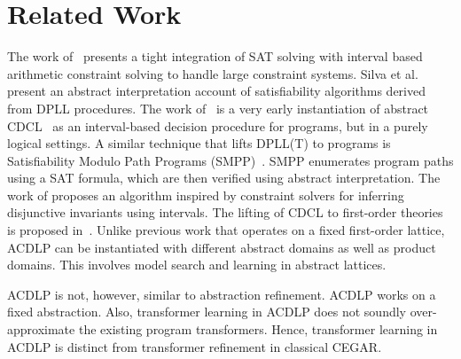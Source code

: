 \section{Related Work}
%
The work of~\cite{franzle} presents a tight integration of SAT solving
with interval based arithmetic constraint solving to handle large constraint
systems. 
%
Silva et al.~\cite{sas12} present an abstract interpretation account of 
satisfiability algorithms derived from DPLL procedures.  
%
The work of~\cite{tacas12} is a very early instantiation of abstract 
CDCL~\cite{sas12} as an interval-based decision procedure for programs, 
but in a purely logical settings.  
%
A similar technique that lifts DPLL(T) to programs is Satisfiability Modulo 
Path Programs (SMPP)~\cite{SMPP}. SMPP enumerates program paths using a SAT 
formula, which are then verified using abstract interpretation.  
%
The work of \cite{DBLP:conf/esop/MineBR16} proposes an algorithm inspired by 
constraint solvers for inferring disjunctive invariants using intervals.
%
The lifting of CDCL to first-order theories is proposed in~\cite{dpll,ndsmt}.
%
  Unlike previous work that operates on a fixed first-order lattice,
  ACDLP can be instantiated with different abstract domains as well as {product
  domains}.  This
  involves model search and learning in abstract lattices.  
  
  ACDLP is not, however,
  similar to abstraction refinement. ACDLP works on a fixed
  abstraction. Also, transformer learning in ACDLP does not soundly over-approximate
  the existing program transformers. Hence, transformer learning in ACDLP is
  distinct from transformer refinement in classical CEGAR. 

%
%
%
%


